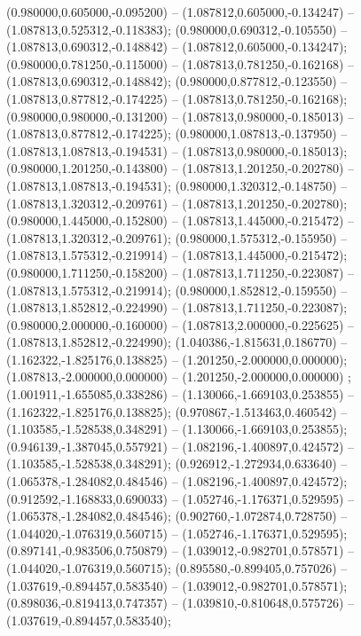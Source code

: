  (0.980000,0.605000,-0.095200) -- (1.087812,0.605000,-0.134247) -- (1.087813,0.525312,-0.118383);
 (0.980000,0.690312,-0.105550) -- (1.087813,0.690312,-0.148842) -- (1.087812,0.605000,-0.134247);
 (0.980000,0.781250,-0.115000) -- (1.087813,0.781250,-0.162168) -- (1.087813,0.690312,-0.148842);
 (0.980000,0.877812,-0.123550) -- (1.087813,0.877812,-0.174225) -- (1.087813,0.781250,-0.162168);
 (0.980000,0.980000,-0.131200) -- (1.087813,0.980000,-0.185013) -- (1.087813,0.877812,-0.174225);
 (0.980000,1.087813,-0.137950) -- (1.087813,1.087813,-0.194531) -- (1.087813,0.980000,-0.185013);
 (0.980000,1.201250,-0.143800) -- (1.087813,1.201250,-0.202780) -- (1.087813,1.087813,-0.194531);
 (0.980000,1.320312,-0.148750) -- (1.087813,1.320312,-0.209761) -- (1.087813,1.201250,-0.202780);
 (0.980000,1.445000,-0.152800) -- (1.087813,1.445000,-0.215472) -- (1.087813,1.320312,-0.209761);
 (0.980000,1.575312,-0.155950) -- (1.087813,1.575312,-0.219914) -- (1.087813,1.445000,-0.215472);
 (0.980000,1.711250,-0.158200) -- (1.087813,1.711250,-0.223087) -- (1.087813,1.575312,-0.219914);
 (0.980000,1.852812,-0.159550) -- (1.087813,1.852812,-0.224990) -- (1.087813,1.711250,-0.223087);
 (0.980000,2.000000,-0.160000) -- (1.087813,2.000000,-0.225625) -- (1.087813,1.852812,-0.224990);
 (1.040386,-1.815631,0.186770) -- (1.162322,-1.825176,0.138825) -- (1.201250,-2.000000,0.000000);
 (1.087813,-2.000000,0.000000) -- (1.201250,-2.000000,0.000000) ;
 (1.001911,-1.655085,0.338286) -- (1.130066,-1.669103,0.253855) -- (1.162322,-1.825176,0.138825);
 (0.970867,-1.513463,0.460542) -- (1.103585,-1.528538,0.348291) -- (1.130066,-1.669103,0.253855);
 (0.946139,-1.387045,0.557921) -- (1.082196,-1.400897,0.424572) -- (1.103585,-1.528538,0.348291);
 (0.926912,-1.272934,0.633640) -- (1.065378,-1.284082,0.484546) -- (1.082196,-1.400897,0.424572);
 (0.912592,-1.168833,0.690033) -- (1.052746,-1.176371,0.529595) -- (1.065378,-1.284082,0.484546);
 (0.902760,-1.072874,0.728750) -- (1.044020,-1.076319,0.560715) -- (1.052746,-1.176371,0.529595);
 (0.897141,-0.983506,0.750879) -- (1.039012,-0.982701,0.578571) -- (1.044020,-1.076319,0.560715);
 (0.895580,-0.899405,0.757026) -- (1.037619,-0.894457,0.583540) -- (1.039012,-0.982701,0.578571);
 (0.898036,-0.819413,0.747357) -- (1.039810,-0.810648,0.575726) -- (1.037619,-0.894457,0.583540);
